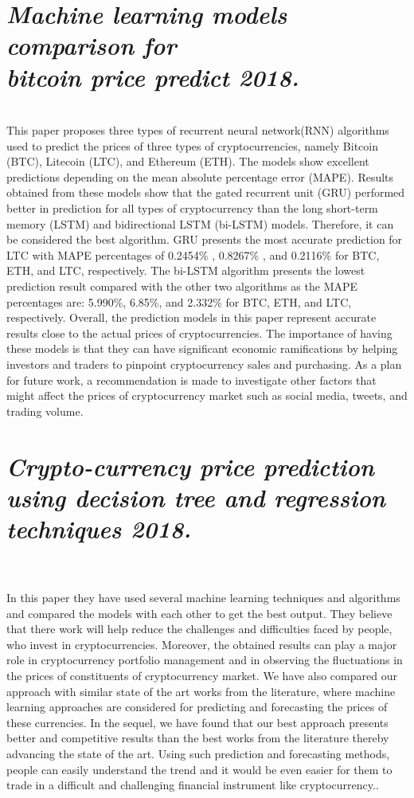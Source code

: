 \documentclass[openany,12pt]{report}
\begin{document}
\section{{\textit{Machine learning models comparison for\\bitcoin price predict 2018.}}}\\
This paper proposes three types of recurrent neural network(RNN) algorithms used to predict the prices of three types of cryptocurrencies, namely Bitcoin
(BTC), Litecoin (LTC), and Ethereum (ETH). The models show excellent predictions depending on
the mean absolute percentage error (MAPE). Results obtained from these models show that the
gated recurrent unit (GRU) performed better in prediction for all types of cryptocurrency than the long short-term memory (LSTM) and bidirectional LSTM (bi-LSTM) models. Therefore, it can be
considered the best algorithm. GRU presents the most accurate prediction for LTC with MAPE
percentages of 0.2454\% , 0.8267\% , and 0.2116\% for BTC, ETH, and LTC, respectively. The bi-LSTM
algorithm presents the lowest prediction result compared with the other two algorithms as the
MAPE percentages are: 5.990\%, 6.85\%, and 2.332\% for BTC, ETH, and LTC, respectively. Overall, the
prediction models in this paper represent accurate results close to the actual prices of cryptocurrencies.
The importance of having these models is that they can have significant economic ramifications
by helping investors and traders to pinpoint cryptocurrency sales and purchasing. As a plan for
future work, a recommendation is made to investigate other factors that might affect the prices of
cryptocurrency market such as social media, tweets, and trading volume\cite{paper2}.\\
\section{\textit{Crypto-currency price prediction using decision tree and regression techniques 2018.}}\\
\\In this paper they have used several machine learning techniques and algorithms and compared the models with each other to get the best output. They believe that there work will help reduce the challenges and difficulties faced by people, who invest in cryptocurrencies. Moreover, the obtained results 
can play a major role in cryptocurrency portfolio management and in observing the fluctuations in the prices of constituents of cryptocurrency market. We have also compared our approach with similar state of the art works from the literature, where machine learning approaches are considered for predicting and forecasting the prices of these currencies. In the sequel, we have found that our best approach presents better and competitive results than the best works from the literature thereby advancing the state of the art. Using such prediction and forecasting methods, people can easily understand the trend and it would be even easier for 
them to trade in a difficult and challenging financial instrument like cryptocurrency.\cite{paper5}.\\
\end{document}
